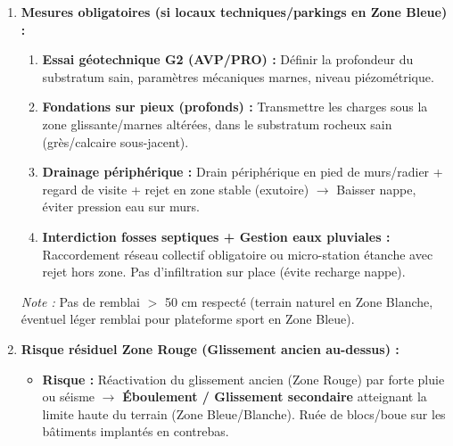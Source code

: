 \documentclass[11pt]{article}
\begin{document}
\begin{exoresolu}
\begin{enumerate}
            \textit{Stratégie d'implantation :} Implanter \textbf{tous les bâtiments (salles de classe, admin, réfectoire, internat) en ZONE BLANCHE} (partie basse plate). Réserver la ZONE BLEUE (partie haute) aux \textbf{espaces extérieurs non construits} : cour de récréation, terrains de sport, parkings, espaces verts, bassins de rétention eaux pluviales.
            \textit{Justification :} La Zone Blanche n'a pas de prescription aléa mouvement de terrain. La Zone Bleue autorise des aménagements légers sous prescriptions, mais interdit les constructions lourdes (collège = enjeu vie humaine très fort, vulnérabilité élevée). Placer 600 élèves en zone aléa modéré est inacceptable au regard du principe de précaution (PPRI).
        \item \textbf{Mesures obligatoires (si locaux techniques/parkings en Zone Bleue) :}
            \begin{enumerate}
                \item \textbf{Essai géotechnique G2 (AVP/PRO) :} Définir la profondeur du substratum sain, paramètres mécaniques marnes, niveau piézométrique.
                \item \textbf{Fondations sur pieux (profonds) :} Transmettre les charges sous la zone glissante/marnes altérées, dans le substratum rocheux sain (grès/calcaire sous-jacent).
                \item \textbf{Drainage périphérique :} Drain périphérique en pied de murs/radier + regard de visite + rejet en zone stable (exutoire) $\rightarrow$ Baisser nappe, éviter pression eau sur murs.
                \item \textbf{Interdiction fosses septiques + Gestion eaux pluviales :} Raccordement réseau collectif obligatoire ou micro-station étanche avec rejet hors zone. Pas d'infiltration sur place (évite recharge nappe).
            \end{enumerate}
            \textit{Note :} Pas de remblai $>$ 50 cm respecté (terrain naturel en Zone Blanche, éventuel léger remblai pour plateforme sport en Zone Bleue).
        \item \textbf{Risque résiduel Zone Rouge (Glissement ancien au-dessus) :}
            \begin{itemize}
                \item \textbf{Risque :} Réactivation du glissement ancien (Zone Rouge) par forte pluie ou séisme $\rightarrow$ \textbf{Éboulement / Glissement secondaire} atteignant la limite haute du terrain (Zone Bleue/Blanche). Ruée de blocs/boue sur les bâtiments implantés en contrebas.

\end{itemize}
\end{enumerate}
\end{exoresolu}
\end{document}
